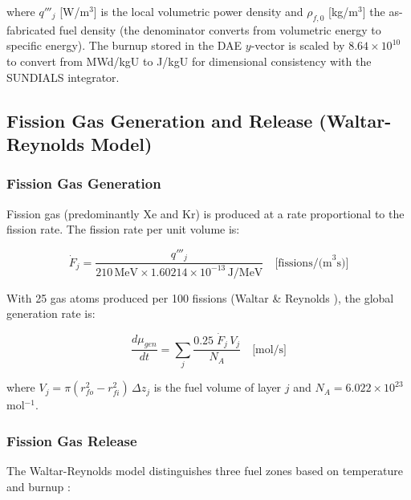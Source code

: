 \begin{refsection}
where $q'''_j$ [W/m$^3$] is the local volumetric power density and $\rho_{f,0}$ [kg/m$^3$] the as-fabricated fuel density (the denominator converts from volumetric energy to specific energy).  The burnup stored in the DAE $y$-vector is scaled by $8.64\times10^{10}$ to convert from MWd/kgU to J/kgU for dimensional consistency with the SUNDIALS integrator.

\subsection{Fission Gas Generation and Release (Waltar-Reynolds Model)}
\label{sec:fgr}

\subsubsection{Fission Gas Generation}

Fission gas (predominantly Xe and Kr) is produced at a rate proportional to the fission rate.  The fission rate per unit volume is:

\begin{equation}
  \dot{F}_j = \frac{q'''_j}{210\,\text{MeV} \times 1.60214\times10^{-13}\,\text{J/MeV}}
  \quad \text{[fissions/(m}^3\text{s)]}
  \label{eq:fission_rate}
\end{equation}

With 25 gas atoms produced per 100 fissions (Waltar \& Reynolds \cite{waltar1981}), the global generation rate is:

\begin{equation}
  \frac{d\mu_{gen}}{dt}
  = \sum_j \frac{0.25\;\dot{F}_j\,V_j}{N_A}
  \quad \text{[mol/s]}
  \label{eq:fggen_ode}
\end{equation}

where $V_j = \pi(r_{fo}^2 - r_{fi}^2)\,\Delta z_j$ is the fuel volume of layer $j$ and $N_A = 6.022\times10^{23}$\,mol$^{-1}$.

\subsubsection{Fission Gas Release}

The Waltar-Reynolds model distinguishes three fuel zones based on temperature and burnup \cite{waltar1981}:


\end{refsection}
